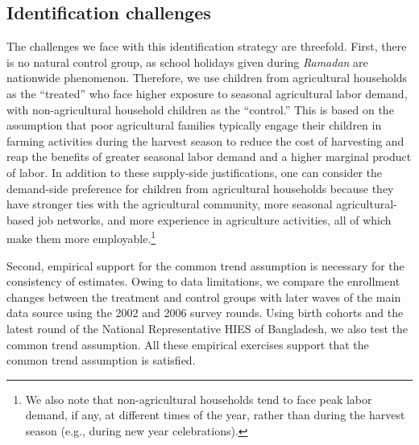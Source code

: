 \documentclass[12pt,letterpaper]{article}
\newcommand{\0}{\ensuremath{\mbox{\boldmath $0$}}}
\begin{document}
\subsection{Identification challenges \label{sec.identification_challange}}

The challenges we face with this identification strategy are threefold. First, there is no natural control group, as school holidays given during \textit{Ramadan} are nationwide phenomenon. Therefore, we use children from agricultural households as the ``treated'' who face higher exposure to seasonal agricultural labor demand, with non-agricultural household children as the ``control.'' This is based on the assumption that poor agricultural families typically engage their children in farming activities during the harvest season to reduce the cost of harvesting and reap the benefits of greater seasonal labor demand and a higher marginal product of labor. In addition to these supply-side justifications, one can consider the demand-side preference for children from agricultural households because they have stronger ties with the agricultural community, more seasonal agricultural-based job networks, and more experience in agriculture activities, all of which make them more employable.\footnote{We also note that non-agricultural households tend to face peak labor demand, if any, at different times of the year, rather than during the harvest season (e.g., during new year celebrations).}

Second, empirical support for the common trend assumption is necessary for the consistency of estimates. Owing to data limitations, we compare the enrollment changes between the treatment and control groups with later waves of the main data source using the 2002 and 2006 survey rounds. Using birth cohorts and the latest round of the National Representative HIES of Bangladesh, we also test the common trend assumption. All these empirical exercises support that the common trend assumption is satisfied.  
 
\end{document}

